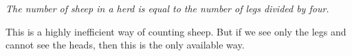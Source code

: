 

\setcounter{section}{1}
\setcounter{subsection}{4}
\setcounter{dfn}{3}

\begin{center}
\parbox{.9\textwidth}{\emph{The number of sheep in a herd is equal to the number of legs divided by four.}}
\end{center}
This is a highly inefficient way of counting sheep.
But if we see only the legs and cannot see the heads, then this is the only available way.



